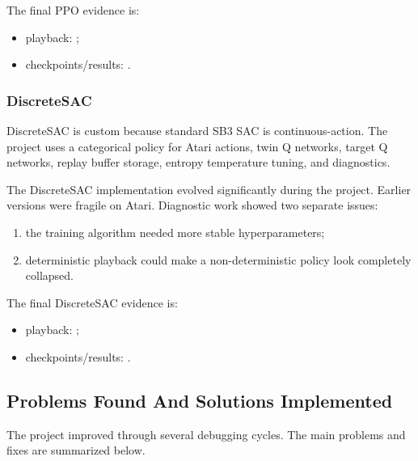 \documentclass[11pt]{article}
\begin{document}
The final PPO evidence is:

\begin{itemize}
\item playback: ;
\item checkpoints/results: .
\end{itemize}

\subsubsection*{DiscreteSAC}

DiscreteSAC is custom because standard SB3 SAC is continuous-action. The project uses a categorical policy for Atari actions, twin Q networks, target Q networks, replay buffer storage, entropy temperature tuning, and diagnostics.

The DiscreteSAC implementation evolved significantly during the project. Earlier versions were fragile on Atari. Diagnostic work showed two separate issues:

\begin{enumerate}
\item the training algorithm needed more stable hyperparameters;
\item deterministic playback could make a non-deterministic policy look completely collapsed.
\end{enumerate}

The final DiscreteSAC evidence is:

\begin{itemize}
\item playback: ;
\item checkpoints/results: .
\end{itemize}

\subsection*{Problems Found And Solutions Implemented}

The project improved through several debugging cycles. The main problems and fixes are summarized below.
\end{document}

